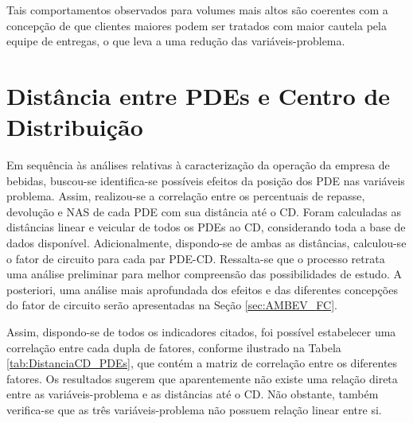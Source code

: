 Tais comportamentos observados para volumes mais altos são coerentes com a concepção de que clientes maiores podem ser tratados com maior cautela pela equipe de entregas, o que leva a uma redução das variáveis-problema.

\section{Distância entre PDEs e Centro de Distribuição} \label{sec:distanciaCDAmbev}

Em sequência às análises relativas à caracterização da operação da empresa de bebidas, buscou-se identifica-se possíveis efeitos da posição dos PDE nas variáveis problema. Assim, realizou-se a correlação entre os percentuais de repasse, devolução e NAS de cada PDE com sua distância até o CD. 
Foram calculadas as distâncias linear e veicular de todos os PDEs ao CD, considerando toda a base de dados disponível.
Adicionalmente, dispondo-se de ambas as distâncias, calculou-se o fator de circuito para cada par PDE-CD.
Ressalta-se que o processo retrata uma análise preliminar para melhor compreensão das possibilidades de estudo. A posteriori, uma análise mais aprofundada dos efeitos e das diferentes concepções do fator de circuito serão apresentadas na Seção \ref{sec:AMBEV_FC}.

Assim, dispondo-se de todos os indicadores citados, foi possível estabelecer uma correlação entre cada dupla de fatores, conforme ilustrado na Tabela \ref{tab:DistanciaCD_PDEs}, que contém a matriz de correlação entre os diferentes fatores.
Os resultados sugerem que aparentemente não existe uma relação direta entre as variáveis-problema e as distâncias até o CD.
Não obstante, também verifica-se que as três variáveis-problema não possuem relação linear entre si.


